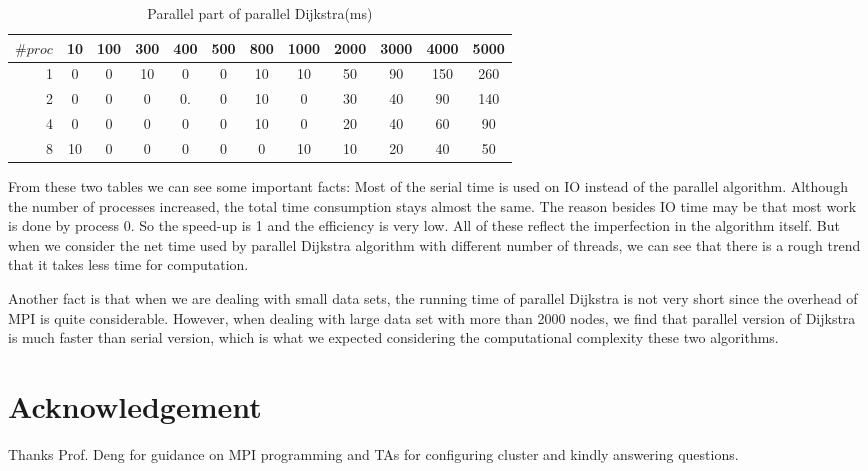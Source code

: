 \documentclass{article}
\begin{document}
\begin{table}[H]
\begin{tabular}[t]{r|ccccccccccc}
$\# proc$&10&100&300&400&500&800&1000&2000&3000&4000&5000\\
\hline
1&0&0&10&0&0&10&10&50&90&150&260\\
2&0&0&0&0.&0&10&0&30&40&90&140\\
4&0&0&0&0&0&10&0&20&40&60&90\\
8&10&0&0&0&0&0&10&10&20&40&50\\
\end{tabular}
\caption{Parallel part of parallel Dijkstra(ms)}
\end{table}
From these two tables we can see some important facts: Most of the serial time is used on IO instead of the parallel algorithm. Although the number of processes increased, the total time consumption stays almost the same. The reason besides IO time may be that most work is done by process 0. So the speed-up is 1 and the efficiency is very low. All of these reflect the imperfection in the algorithm itself. But when we consider the net time used by parallel Dijkstra algorithm with different number of threads, we can see that there is a rough trend that it takes less time for computation.

Another fact is that when we are dealing with small data sets, the running time of parallel Dijkstra is not very short since the overhead of MPI is quite considerable. However, when dealing with large data set with more than 2000 nodes, we find that parallel version of Dijkstra is much faster than serial version, which is what we expected considering the computational complexity these two algorithms.

\section*{Acknowledgement}
Thanks Prof. Deng for guidance on MPI programming and TAs for configuring cluster and kindly answering questions.
\end{document}
